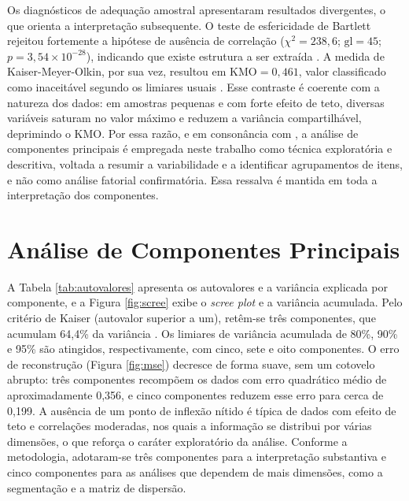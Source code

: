 Os diagnósticos de adequação amostral apresentaram resultados divergentes, o que orienta a interpretação subsequente. O teste de esfericidade de Bartlett rejeitou fortemente a hipótese de ausência de correlação ($\chi^2 = 238{,}6$; $\mathrm{gl} = 45$; $p = 3{,}54 \times 10^{-28}$), indicando que existe estrutura a ser extraída \cite{bartlett1950}. A medida de Kaiser-Meyer-Olkin, por sua vez, resultou em $\mathrm{KMO} = 0{,}461$, valor classificado como inaceitável segundo os limiares usuais \cite{kaiser1974,field2018}. Esse contraste é coerente com a natureza dos dados: em amostras pequenas e com forte efeito de teto, diversas variáveis saturam no valor máximo e reduzem a variância compartilhável, deprimindo o KMO. Por essa razão, e em consonância com , a análise de componentes principais é empregada neste trabalho como técnica exploratória e descritiva, voltada a resumir a variabilidade e a identificar agrupamentos de itens, e não como análise fatorial confirmatória. Essa ressalva é mantida em toda a interpretação dos componentes.

\section{Análise de Componentes Principais}
\label{sec:res-pca}

A Tabela \ref{tab:autovalores} apresenta os autovalores e a variância explicada por componente, e a Figura \ref{fig:scree} exibe o \textit{scree plot} e a variância acumulada. Pelo critério de Kaiser (autovalor superior a um), retêm-se três componentes, que acumulam 64,4\% da variância \cite{kaiser1960}. Os limiares de variância acumulada de 80\%, 90\% e 95\% são atingidos, respectivamente, com cinco, sete e oito componentes. O erro de reconstrução (Figura \ref{fig:mse}) decresce de forma suave, sem um cotovelo abrupto: três componentes recompõem os dados com erro quadrático médio de aproximadamente 0,356, e cinco componentes reduzem esse erro para cerca de 0,199. A ausência de um ponto de inflexão nítido é típica de dados com efeito de teto e correlações moderadas, nos quais a informação se distribui por várias dimensões, o que reforça o caráter exploratório da análise. Conforme a metodologia, adotaram-se três componentes para a interpretação substantiva e cinco componentes para as análises que dependem de mais dimensões, como a segmentação e a matriz de dispersão.


